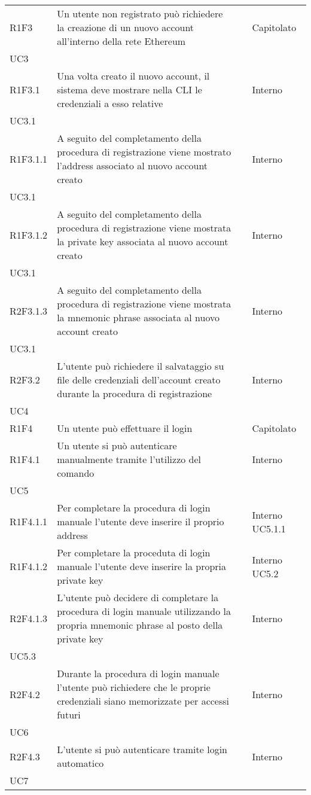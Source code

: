 \begin{longtable}{ 
		>{\centering}p{} 
		>{}p{} 
		>{\centering}p{}
		>{\centering}p{} }
	R1F3 & Un utente non registrato può richiedere la creazione di un nuovo account
			 all'interno della rete Ethereum\ped{\textit{G}}						& \ob & Capitolato \\ UC3 \tabularnewline
	R1F3.1 & Una volta creato il nuovo account, il sistema deve mostrare nella 
			CLI le credenziali a esso relative										& \ob & Interno \\ UC3.1 \tabularnewline
	R1F3.1.1 & A seguito del completamento della procedura di registrazione viene
			mostrato l'address associato al nuovo account creato 					& \ob & Interno \\ UC3.1 \tabularnewline
	R1F3.1.2 & A seguito del completamento della procedura di registrazione viene
			mostrata la private key associata al nuovo account creato 				& \ob & Interno \\ UC3.1 \tabularnewline
	R2F3.1.3 & A seguito del completamento della procedura di registrazione viene
			mostrata la mnemonic phrase associata al nuovo account creato 			& \de & Interno \\ UC3.1 \tabularnewline
	R2F3.2 & L'utente può richiedere il salvataggio su file delle credenziali 
			dell'account creato durante la procedura di registrazione				& \de & Interno \\ UC4 \tabularnewline

	R1F4 & Un utente può effettuare il login 										& \ob & Capitolato \tabularnewline
	R1F4.1 & Un utente si può autenticare manualmente tramite l'utilizzo 
			del comando \login{} 													& \ob & Interno \\ UC5 \tabularnewline
	R1F4.1.1 & Per completare la procedura di login manuale l'utente deve inserire
			 il proprio address														& \ob & Interno UC5.1.1 \tabularnewline
	R1F4.1.2 & Per completare la proceduta di login manuale l'utente deve inserire
			 la propria private key 												& \ob & Interno UC5.2 \tabularnewline
	R2F4.1.3 & L'utente può decidere di completare la procedura di login manuale 
			 utilizzando la propria mnemonic phrase al posto della private key		& \de & Interno \\ UC5.3 \tabularnewline
	R2F4.2 & Durante la procedura di login manuale l'utente può richiedere che
			 le proprie credenziali siano memorizzate per accessi futuri 			& \de & Interno \\ UC6 \tabularnewline
	R2F4.3 & L'utente si può autenticare tramite login automatico 					& \de & Interno \\ UC7 \tabularnewline
	

\end{longtable}
